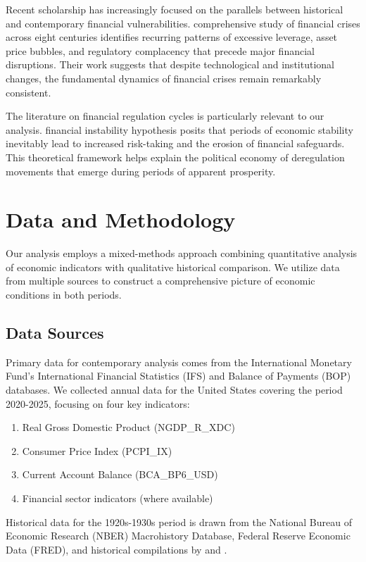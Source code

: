 \documentclass[12pt,letterpaper]{article}
\begin{document}
Recent scholarship has increasingly focused on the parallels between historical and contemporary financial vulnerabilities. \cite{reinhart2009} comprehensive study of financial crises across eight centuries identifies recurring patterns of excessive leverage, asset price bubbles, and regulatory complacency that precede major financial disruptions. Their work suggests that despite technological and institutional changes, the fundamental dynamics of financial crises remain remarkably consistent.

The literature on financial regulation cycles is particularly relevant to our analysis. \cite{minsky1986} financial instability hypothesis posits that periods of economic stability inevitably lead to increased risk-taking and the erosion of financial safeguards. This theoretical framework helps explain the political economy of deregulation movements that emerge during periods of apparent prosperity.

\section{Data and Methodology}

Our analysis employs a mixed-methods approach combining quantitative analysis of economic indicators with qualitative historical comparison. We utilize data from multiple sources to construct a comprehensive picture of economic conditions in both periods.

\subsection{Data Sources}

Primary data for contemporary analysis comes from the International Monetary Fund's International Financial Statistics (IFS) and Balance of Payments (BOP) databases. We collected annual data for the United States covering the period 2020-2025, focusing on four key indicators:

\begin{enumerate}
\item Real Gross Domestic Product (NGDP\_R\_XDC)
\item Consumer Price Index (PCPI\_IX)
\item Current Account Balance (BCA\_BP6\_USD)
\item Financial sector indicators (where available)
\end{enumerate}

Historical data for the 1920s-1930s period is drawn from the National Bureau of Economic Research (NBER) Macrohistory Database, Federal Reserve Economic Data (FRED), and historical compilations by \cite{friedman1963} and \cite{romer1999}.
\end{document}
